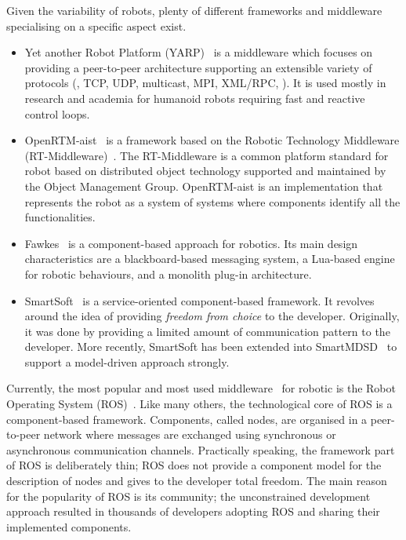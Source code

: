 Given the variability of robots, plenty of different frameworks and middleware specialising on a specific aspect exist. 
\begin{itemize}
\item Yet another Robot Platform (YARP)~\cite{metta2006yarp} is a middleware which focuses on providing a peer-to-peer architecture supporting an extensible variety of protocols (\eg, TCP, UDP, multicast, MPI, XML/RPC, \etc). It is used mostly in research and academia for humanoid robots requiring fast and reactive control loops. 
\item OpenRTM-aist~\cite{ando2008software} is a framework based on the Robotic Technology Middleware (RT-Middleware)~\cite{ando2005rt}. The RT-Middleware is a common platform standard for robot based on distributed object technology supported and maintained by the Object Management Group. OpenRTM-aist is an implementation that represents the robot as a system of systems where components identify all the functionalities.
\item Fawkes~\cite{niemueller2010design} is a component-based approach for robotics. Its main design characteristics are a blackboard-based messaging system, a Lua-based engine for robotic behaviours, and a monolith plug-in architecture.
\item SmartSoft~\cite{schlegel1999software} is a service-oriented component-based framework. It revolves around the idea of providing \textit{freedom from choice} to the developer. Originally, it was done by providing a limited amount of communication pattern to the developer. More recently, SmartSoft has been extended into SmartMDSD~\cite{dennis2016smartmdsd} to support a model-driven approach strongly.
\end{itemize}

Currently, the most popular and most used middleware~\cite{elkady2012robotics} for robotic is the Robot Operating System (ROS)~\cite{quigley2009ros}. Like many others, the technological core of ROS is a component-based framework. Components, called nodes, are organised in a peer-to-peer network where messages are exchanged using synchronous or asynchronous communication channels. Practically speaking, the framework part of ROS is deliberately thin; ROS does not provide a component model for the description of nodes and gives to the developer total freedom. The main reason for the popularity of ROS is its community; the unconstrained development approach resulted in thousands of developers adopting ROS and sharing their implemented components.

